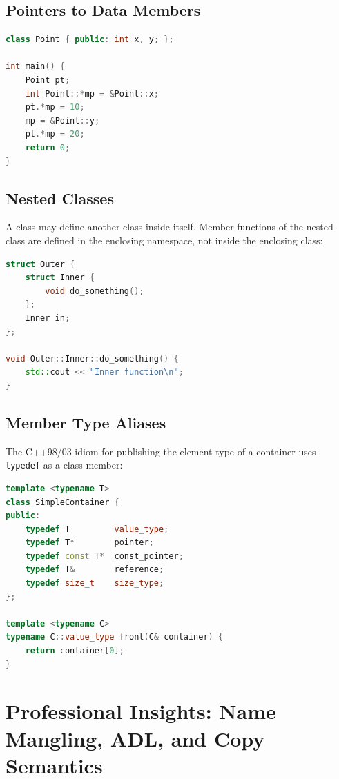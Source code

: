 \subsection{Pointers to Data Members}

\begin{lstlisting}[language=C++, caption={Pointer to data member}]
class Point { public: int x, y; };

int main() {
    Point pt;
    int Point::*mp = &Point::x;
    pt.*mp = 10;
    mp = &Point::y;
    pt.*mp = 20;
    return 0;
}
\end{lstlisting}

\subsection{Nested Classes}

A class may define another class inside itself. Member functions of the nested class are defined in the enclosing namespace, not inside the enclosing class:

\begin{lstlisting}[language=C++, caption={Nested class definition}]
struct Outer {
    struct Inner {
        void do_something();
    };
    Inner in;
};

void Outer::Inner::do_something() {
    std::cout << "Inner function\n";
}
\end{lstlisting}

\subsection{Member Type Aliases}

The C++98/03 idiom for publishing the element type of a container uses \texttt{typedef} as a class member:

\begin{lstlisting}[language=C++, caption={Member typedef for type-alias publication}]
template <typename T>
class SimpleContainer {
public:
    typedef T         value_type;
    typedef T*        pointer;
    typedef const T*  const_pointer;
    typedef T&        reference;
    typedef size_t    size_type;
};

template <typename C>
typename C::value_type front(C& container) {
    return container[0];
}
\end{lstlisting}

\section{Professional Insights: Name Mangling, ADL, and Copy Semantics}
\label{sec:pro-insights-ch5}

